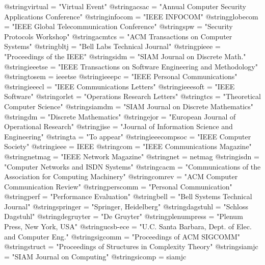 @string{virtual =               "Virtual Event"}
@string{acsac =                 "Annual Computer Security Applications Conference"}
@string{infocom =               "{IEEE} {INFOCOM}"}
@string{globecom =              "{IEEE} Global Telecommunication Conference"}
@string{spw =                   "Security Protocols Workshop"}
@string{acmtcs =                "{ACM} Transactions on Computer Systems"}
@string{bltj =                  "Bell Labs Technical Journal"}
@string{pieee =                 "Proceedings of the {IEEE}"}
@string{sidm =                  "{SIAM} Journal on Discrete Math."}
@string{ieeetse =               "{IEEE} Transactions on Software Engineering and Methodology"}
@string{tosem =                 ieeetse}
@string{ieeepc =                "{IEEE} Personal Communications"}
@string{ieeecl =                "{IEEE} Communications Letters"}
@string{ieeesoft =              "{IEEE} Software"}
@string{orlet =                 "Operations Research Letters"}
@string{tcs =                   "Theoretical Computer Science"}
@string{siamdm =                "{SIAM} Journal on Discrete Mathematics"}
@string{dm =                    "Discrete Mathematics"}
@string{ejor =                  "European Journal of Operational Research"}
@string{jise =                  "Journal of Information Science and Engineering"}
@string{ta =                    "To appear"}
@string{ieeecompsoc =           "{IEEE} Computer Society"}
@string{ieee =                  {IEEE}}
@string{com =                   "{IEEE} Communications Magazine"}
@string{netmag =                "{IEEE} Network Magazine"}
@string{net =                   netmag}
@string{isdn =                  "Computer Networks and {ISDN} Systems"}
@string{cacm =                  "Communications of the Association for Computing Machinery"}
@string{comrev =                "{ACM} Computer Communication Review"}
@string{perscomm =              "Personal Communication"}
@string{perf =                  "Performance Evaluation"}
@string{bell =                  "Bell Systems Technical Journal"}
@string{springer =              "Springer, Heidelberg"}
@string{dagstuhl =              "Schloss Dagstuhl"}
@string{degruyter =             "De Gruyter"}
@string{plenumpress =           "Plenum Press, New York, USA"}
@string{ucsb-ece =              "U.C. Santa Barbara, Dept. of Elec. and Computer Eng."}
@string{sigcomm =               "Proceedings of {ACM} {SIGCOMM}"}
@string{struct =                "Proceedings of Structures in Complexity Theory"}
@string{siamjc =                "{SIAM} Journal on Computing"}
@string{sicomp =                siamjc}
